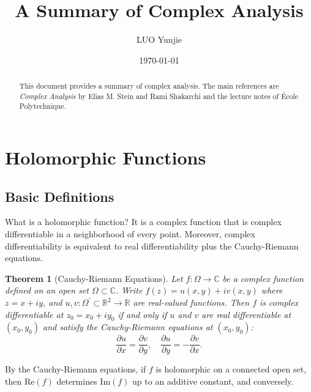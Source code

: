 \documentclass{article}
\title{\textbf{A Summary of Complex Analysis}}
\author{LUO Yunjie}
\date{\today}
\newtheorem{theorem}{Theorem}[section]
\theoremstyle{definition}
\newcommand{\R}{\mathbb{R}}
\newcommand{\C}{\mathbb{C}}
\newcommand{\re}{\mathrm{Re}}
\newcommand{\im}{\mathrm{Im}}
\begin{document}
\maketitle
\begin{abstract}
    This document provides a summary of complex analysis. The main references are \emph{Complex Analysis} by Elias M. Stein and Rami Shakarchi and the lecture notes of \'Ecole Polytechnique.
\end{abstract}
\tableofcontents
\newpage
\section{Holomorphic Functions}
\subsection{Basic Definitions}
What is a holomorphic function? It is a complex function that is complex differentiable in a neighborhood of every point. Moreover, complex differentiability is equivalent to real differentiability plus the Cauchy-Riemann equations.
\begin{theorem}[Cauchy-Riemann Equations]
Let \(f\colon\Omega\to\C\) be a complex function defined on an open set \(\Omega\subset\C\). Write \(f(z)=u(x,y)+i v(x,y)\) where \(z=x+i y\), and \(u,v\colon\Omega^{\prime}\subset\R^2\to\R\) are real-valued functions. 
Then \(f\) is complex differentiable at \(z_0=x_0+iy_0\) if and only if \(u\) and \(v\) are real differentiable at \((x_0,y_0)\) and satisfy the Cauchy-Riemann equations at \((x_0,y_0)\):
\[\frac{\partial u}{\partial x} = \frac{\partial v}{\partial y}, \quad \frac{\partial u}{\partial y} = -\frac{\partial v}{\partial x}.\]
\end{theorem}
By the Cauchy-Riemann equations, if \( f \) is holomorphic on a connected open set, then \( \re(f) \) determines \( \im(f) \) up to an additive constant, and conversely.
\end{document}
